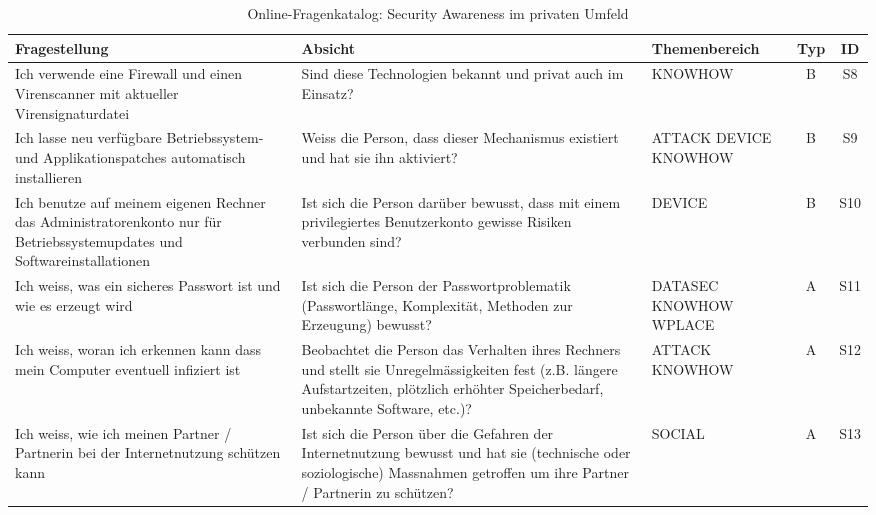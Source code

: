 \documentclass[../../main.tex]{subfiles}
\begin{document}

\sloppy 

\begin{table}[H]
\tablefontsize	
\centering
\caption{Online-Fragenkatalog: Security Awareness im privaten Umfeld}
\label{Security Awareness im privaten Umfeld}
\begin{tabular}{ |p{5.5cm}|p{5.5cm}|p{2.5cm}|c|c|}

\hline
\tableheaderbgcolor
\textbf{Fragestellung} & \textbf{Absicht} & \textbf{Themenbereich} & \textbf{Typ} & \textbf{ID}\\ 
\hline
Ich verwende eine Firewall und einen Virenscanner mit aktueller Virensignaturdatei &  Sind diese Technologien bekannt und privat auch im Einsatz? & KNOWHOW & B & S8 \\
\hline

Ich lasse neu verfügbare Betriebssystem- und Applikationspatches automatisch \newline installieren &  Weiss die Person, dass dieser Mechanismus existiert und hat sie ihn aktiviert? & ATTACK \newline DEVICE \newline KNOWHOW & B & S9 \\
\hline

Ich benutze auf meinem eigenen Rechner das Administratorenkonto nur für Betriebssystemupdates und Softwareinstallationen &  Ist sich die Person darüber bewusst, dass mit einem privilegiertes Benutzerkonto gewisse Risiken verbunden sind? & DEVICE & B & S10 \\
\hline

Ich weiss, was ein sicheres Passwort ist und wie es erzeugt wird &  Ist sich die Person der Passwortproblematik (Passwortlänge, Komplexität, Methoden zur Erzeugung) bewusst? & DATASEC \newline KNOWHOW \newline WPLACE & A & S11 \\
\hline

Ich weiss, woran ich erkennen kann dass mein Computer eventuell infiziert ist &  Beobachtet die Person das Verhalten ihres Rechners und stellt sie Unregelmässigkeiten fest (z.B. längere Aufstartzeiten, plötzlich erhöhter Speicherbedarf, unbekannte Software, etc.)? & ATTACK \newline KNOWHOW & A & S12 \\
\hline

Ich weiss, wie ich meinen Partner / Partnerin bei der Internetnutzung schützen kann &  Ist sich die Person über die Gefahren der Internetnutzung bewusst und hat sie (technische oder soziologische) Massnahmen getroffen um ihre Partner / Partnerin zu schützen? & SOCIAL & A & S13 \\
\hline


\end{tabular}
\end{table}
\end{document}
